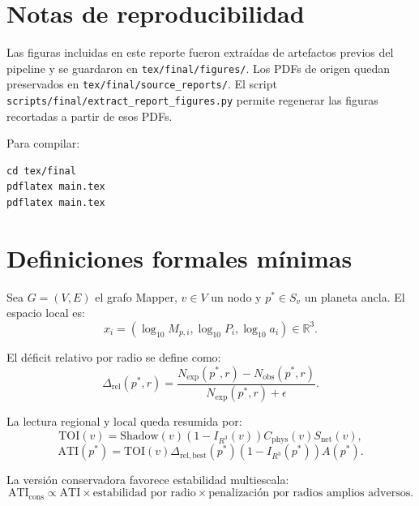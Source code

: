 \documentclass[11pt]{article}
\newcommand{\code}[1]{\texttt{#1}}
\begin{document}
\begin{center}
\end{center}

\appendix
\section{Notas de reproducibilidad}

Las figuras incluidas en este reporte fueron extraídas de artefactos previos del pipeline y se guardaron en \code{tex/final/figures/}. Los PDFs de origen quedan preservados en \code{tex/final/source\_reports/}. El script \code{scripts/final/extract\_report\_figures.py} permite regenerar las figuras recortadas a partir de esos PDFs.

Para compilar:
\begin{verbatim}
cd tex/final
pdflatex main.tex
pdflatex main.tex
\end{verbatim}

\section{Definiciones formales mínimas}

Sea \(G=(V,E)\) el grafo Mapper, \(v\in V\) un nodo y \(p^*\in S_v\) un planeta ancla. El espacio local es:
\[
 x_i=(\log_{10}M_{p,i},\log_{10}P_i,\log_{10}a_i)\in\mathbb{R}^3.
\]

El déficit relativo por radio se define como:
\[
\Delta_{\mathrm{rel}}(p^*,r)=\frac{N_{\mathrm{exp}}(p^*,r)-N_{\mathrm{obs}}(p^*,r)}{N_{\mathrm{exp}}(p^*,r)+\epsilon}.
\]

La lectura regional y local queda resumida por:
\[
\mathrm{TOI}(v)=\mathrm{Shadow}(v)(1-I_{R^3}(v))C_{\mathrm{phys}}(v)S_{\mathrm{net}}(v),
\]
\[
\mathrm{ATI}(p^*)=\mathrm{TOI}(v)\Delta_{\mathrm{rel,best}}(p^*)(1-I_{R^3}(p^*))A(p^*).
\]

La versión conservadora favorece estabilidad multiescala:
\[
\mathrm{ATI}_{\mathrm{cons}}\propto \mathrm{ATI}\times \text{estabilidad por radio}\times \text{penalización por radios amplios adversos}.
\]
\end{document}
